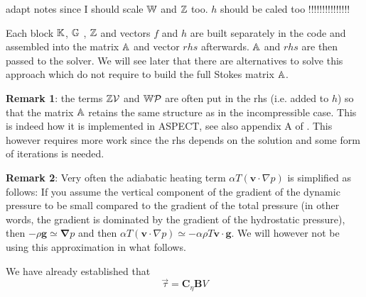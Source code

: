 {\color{red} adapt notes since I should scale ${\mathbb{W}}$ and ${\mathbb{Z}}$ too}.
{\color{red} $h$ should be caled too !!!!!!!!!!!!!!!} 

Each block ${\mathbb{K}}$, ${\mathbb{G}}$ , ${\mathbb{Z}}$ and vectors $f$ and $h$ are built separately 
in the code and assembled into 
the matrix ${\mathbb{A}}$ and vector $rhs$ afterwards. ${\mathbb{A}}$ and $rhs$ are then passed to the solver. 
We will see later that there are alternatives to solve this approach which do not require to 
build the full Stokes matrix ${\mathbb{A}}$. 

{\bf Remark 1}: the terms ${\mathbb{Z}} {\cal V}$ and ${\mathbb{W}} {\cal P}$ are 
often put in the rhs (i.e. added to $h$) so that 
the matrix ${\mathbb{A}}$ retains the same structure as in the incompressible case. This is indeed 
how it is implemented in ASPECT, see also appendix A of \cite{lezh08}. This however requires more work since the rhs depends 
on the solution and some form of iterations is needed. 

{\bf Remark 2}: Very often the adiabatic heating term  
$\alpha T \left( \bm v \cdot \nabla p \right)$ is simplified as follows:
If you assume the vertical component of the gradient of the dynamic pressure to be small compared to the
gradient of the total pressure (in other words, the gradient is dominated by the gradient of the hydrostatic
pressure), then $-\rho {\bm g} \simeq {\bm \nabla}p$ and then 
$\alpha T \left( \bm v \cdot \nabla p \right) \simeq  -\alpha\rho T {\bm v}\cdot{\bm g}$. We will however 
not be using this approximation in what follows.



We have already established that
\[
\vec{\tau} = {\bm C}_\eta {\bm B} V
\]


